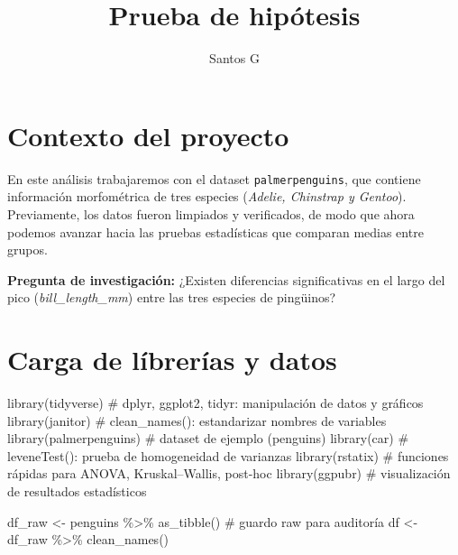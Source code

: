 \documentclass[
  spanish,
  11pt,
  a4paper,
  DIV=11,
  numbers=noendperiod]{scrartcl}
\title{Prueba de hipótesis}
\author{Santos G}
\date{}
\newenvironment{Shaded}{\begin{snugshade}}{\end{snugshade}}
\newcommand{\CommentTok}[1]{\textcolor[rgb]{0.37,0.37,0.37}{#1}}
\newcommand{\FunctionTok}[1]{\textcolor[rgb]{0.28,0.35,0.67}{#1}}
\newcommand{\NormalTok}[1]{\textcolor[rgb]{0.00,0.23,0.31}{#1}}
\newcommand{\OtherTok}[1]{\textcolor[rgb]{0.00,0.23,0.31}{#1}}
\newcommand{\SpecialCharTok}[1]{\textcolor[rgb]{0.37,0.37,0.37}{#1}}
\renewcommand*\contentsname{Tabla de contenidos}
\newcommand\contentsname{Tabla de contenidos}
\begin{document}
\maketitle

\renewcommand*\contentsname{Tabla de contenidos}
{
\hypersetup{linkcolor=}
\setcounter{tocdepth}{2}
\tableofcontents
}

\section{Contexto del proyecto}\label{contexto-del-proyecto}

En este análisis trabajaremos con el dataset \texttt{palmerpenguins},
que contiene información morfométrica de tres especies (\emph{Adelie,
Chinstrap y Gentoo}). Previamente, los datos fueron limpiados y
verificados, de modo que ahora podemos avanzar hacia las pruebas
estadísticas que comparan medias entre grupos.

\textbf{Pregunta de investigación:} ¿Existen diferencias significativas
en el largo del pico (\emph{bill\_length\_mm}) entre las tres especies
de pingüinos?

\section{Carga de líbrerías y
datos}\label{carga-de-luxedbreruxedas-y-datos}

\begin{Shaded}
\begin{Highlighting}[numbers=left,,]
\FunctionTok{library}\NormalTok{(tidyverse)   }\CommentTok{\# dplyr, ggplot2, tidyr: manipulación de datos y gráficos}
\FunctionTok{library}\NormalTok{(janitor)     }\CommentTok{\# clean\_names(): estandarizar nombres de variables}
\FunctionTok{library}\NormalTok{(palmerpenguins) }\CommentTok{\# dataset de ejemplo (penguins)}
\FunctionTok{library}\NormalTok{(car)         }\CommentTok{\# leveneTest(): prueba de homogeneidad de varianzas}
\FunctionTok{library}\NormalTok{(rstatix)     }\CommentTok{\# funciones rápidas para ANOVA, Kruskal–Wallis, post{-}hoc}
\FunctionTok{library}\NormalTok{(ggpubr)      }\CommentTok{\# visualización de resultados estadísticos}

\NormalTok{df\_raw }\OtherTok{\textless{}{-}}\NormalTok{ penguins }\SpecialCharTok{\%\textgreater{}\%} \FunctionTok{as\_tibble}\NormalTok{() }\CommentTok{\# guardo raw para auditoría}
\NormalTok{df }\OtherTok{\textless{}{-}}\NormalTok{ df\_raw }\SpecialCharTok{\%\textgreater{}\%} \FunctionTok{clean\_names}\NormalTok{()}
\end{Highlighting}
\end{Shaded}
\end{document}
